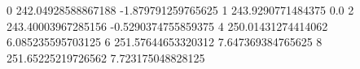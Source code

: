 0 242.04928588867188 -1.879791259765625
1 243.9290771484375 0.0
2 243.40003967285156 -0.5290374755859375
4 250.01431274414062 6.085235595703125
6 251.57644653320312 7.647369384765625
8 251.65225219726562 7.723175048828125
